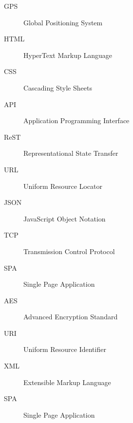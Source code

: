 \documentclass[oneside, 12pt]{book}
\begin{document}


	







\begin{Glossary}
\begin{description}
\item[GPS]Global Positioning System

\item[HTML]HyperText Markup Language

\item[CSS]Cascading Style Sheets

\item[API]Application Programming Interface

\item[ReST]Representational State Transfer

\item[URL]Uniform Resource Locator

\item[JSON]JavaScript Object Notation

\item[TCP]Transmission Control Protocol

\item[SPA]Single Page Application

\item[AES]Advanced Encryption Standard 

\item[URI]Uniform Resource Identifier

\item[XML]Extensible Markup Language

\item[SPA]Single Page Application

\end{description}
\end{Glossary}

\printbibliography

\lastpageinfo
\end{document}
